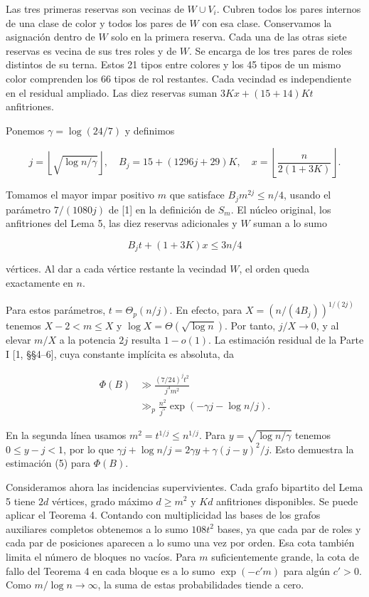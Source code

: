 \documentclass[spanish,11pt,a4paper]{article}
\begin{document}
Las tres primeras reservas son vecinas de \(W\cup V_i\). Cubren todos los pares internos de una clase de color y todos los pares de \(W\) con esa clase. Conservamos la asignación dentro de \(W\) solo en la primera reserva. Cada una de las otras siete reservas es vecina de sus tres roles y de \(W\). Se encarga de los tres pares de roles distintos de su terna. Estos 21 tipos entre colores y los 45 tipos de un mismo color comprenden los 66 tipos de rol restantes. Cada vecindad es independiente en el residual ampliado. Las diez reservas suman \(3Kx+(15+14)Kt\) anfitriones.

Ponemos \(\gamma=\log(24/7)\) y definimos

\[j=\left\lfloor\sqrt{\log n/\gamma}\right\rfloor,\quad
B_j=15+(1296j+29)K,\quad
x=\left\lfloor\frac{n}{2(1+3K)}\right\rfloor.\]

Tomamos el mayor impar positivo \(m\) que satisface \(B_jm^{2j}\le n/4\), usando el parámetro \(7/(1080j)\) de {[}1{]} en la definición de \(S_m\). El núcleo original, los anfitriones del Lema 5, las diez reservas adicionales y \(W\) suman a lo sumo

\[B_jt+(1+3K)x\le 3n/4\]

vértices. Al dar a cada vértice restante la vecindad \(W\), el orden queda exactamente en \(n\).

Para estos parámetros, \(t=\Theta_p(n/j)\). En efecto, para \(X=(n/(4B_j))^{1/(2j)}\) tenemos \(X-2<m\le X\) y \(\log X=\Theta(\sqrt{\log n})\). Por tanto, \(j/X\to0\), y al elevar \(m/X\) a la potencia \(2j\) resulta \(1-o(1)\). La estimación residual de la Parte I {[}1, §§4--6{]}, cuya constante implícita es absoluta, da

\[\begin{aligned}
\Phi(B)&\gg \frac{(7/24)^j t^2}{j^3m^2}\\
&\gg_p \frac{n^2}{j^5}\exp(-\gamma j-\log n/j).
\end{aligned}
\tag{10}\]

En la segunda línea usamos \(m^2=t^{1/j}\le n^{1/j}\). Para \(y=\sqrt{\log n/\gamma}\) tenemos \(0\le y-j<1\), por lo que \(\gamma j+\log n/j=2\gamma y+\gamma(j-y)^2/j\). Esto demuestra la estimación (5) para \(\Phi(B)\).

Consideramos ahora las incidencias supervivientes. Cada grafo bipartito del Lema 5 tiene \(2d\) vértices, grado máximo \(d\ge m^2\) y \(Kd\) anfitriones disponibles. Se puede aplicar el Teorema 4. Contando con multiplicidad las bases de los grafos auxiliares completos obtenemos a lo sumo \(108t^2\) bases, ya que cada par de roles y cada par de posiciones aparecen a lo sumo una vez por orden. Esa cota también limita el número de bloques no vacíos. Para \(m\) suficientemente grande, la cota de fallo del Teorema 4 en cada bloque es a lo sumo \(\exp(-c'm)\) para algún \(c'>0\). Como \(m/\log n\to\infty\), la suma de estas probabilidades tiende a cero.
\end{document}
